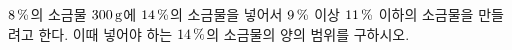 $8\mkern3mu \%$의 소금물 $300\mkern3mu \mathrm{g}$에 $14\mkern3mu \%$의 소금물을 넣어서 $9\mkern3mu \%$ 이상 $11\mkern3mu \%$ 이하의 소금물을 만들려고 한다. 이때 넣어야 하는 $14\mkern3mu \%$의 소금물의 양의 범위를 구하시오.
